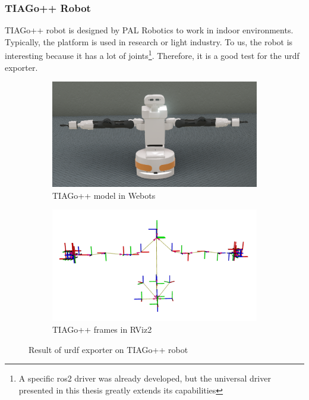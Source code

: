 \subsubsection{TIAGo++ Robot}

TIAGo++ robot is designed by PAL Robotics to work in indoor environments.
Typically, the platform is used in research or light industry. 
To us, the robot is interesting because it has a lot of joints\footnote{A specific \ac{ros2} driver was already developed, but the universal driver presented in this thesis greatly extends its capabilities}.
Therefore, it is a good test for the \ac{urdf} exporter.

\begin{figure}[H]
\centering
\begin{subfigure}{1\textwidth}
  \centering
  \includegraphics[width=\linewidth]{results/figures/tiago_webots.png}
  \caption{TIAGo++ model in Webots}
  \label{fig:results:map:webots}
\end{subfigure}
\begin{subfigure}{1\textwidth}
  \centering
  \includegraphics[width=\linewidth]{results/figures/tiago_frames.png}
  \caption{TIAGo++ frames in RViz2}
  \label{fig:results:tiago:frames}
\end{subfigure}
\caption{Result of \ac{urdf} exporter on TIAGo++ robot}
\label{fig:results:tiago}
\end{figure}

